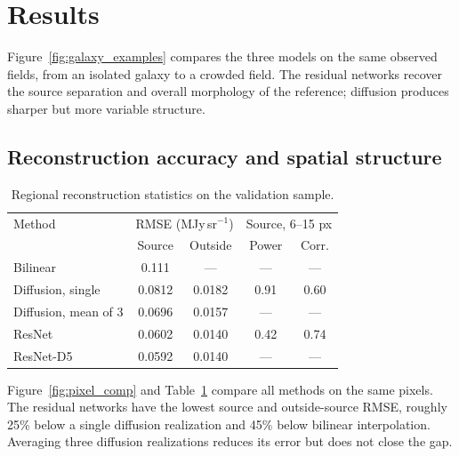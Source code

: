 \documentclass[longauth]{aa}
\begin{document}
\section{\label{sc:results}Results}

Figure~\ref{fig:galaxy_examples} compares the three models on the same observed fields, from an isolated galaxy to a crowded field.
The residual networks recover the source separation and overall morphology of the reference; diffusion produces sharper but more variable structure.

\subsection{Reconstruction accuracy and spatial structure}
\label{sc:reconstruction_results}

\begin{table}
    \caption{Regional reconstruction statistics on the validation sample.}
    \label{tab:regional}
    \centering
    \small
    \setlength{\tabcolsep}{4pt}
    \begin{tabular}{lcccc}
        \hline\hline
        Method & \multicolumn{2}{c}{RMSE (MJy\,sr$^{-1}$)} & \multicolumn{2}{c}{Source, 6--15 px} \\
        & Source & Outside & Power & Corr. \\
        \hline
        Bilinear & 0.111 & --- & --- & --- \\
        Diffusion, single & 0.0812 & 0.0182 & 0.91 & 0.60 \\
        Diffusion, mean of 3 & 0.0696 & 0.0157 & --- & --- \\
        ResNet & 0.0602 & 0.0140 & 0.42 & 0.74 \\
        ResNet-D5 & 0.0592 & 0.0140 & --- & --- \\
        \hline
    \end{tabular}
\end{table}

Figure~\ref{fig:pixel_comp} and Table~\ref{tab:regional} compare all methods on the same pixels.
The residual networks have the lowest source and outside-source RMSE, roughly 25\% below a single diffusion realization and 45\% below bilinear interpolation.
Averaging three diffusion realizations reduces its error but does not close the gap.
\end{document}
